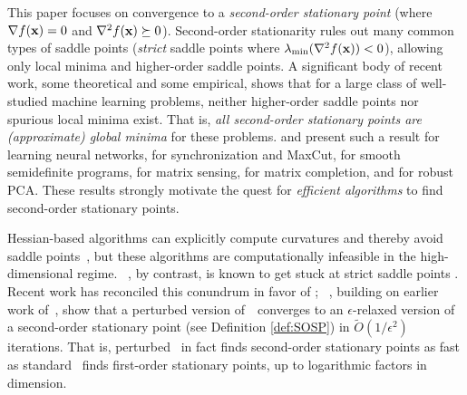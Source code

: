This paper focuses on convergence to a \emph{second-order stationary point} 
(where $\nabla f(\mathbf{x}) = 0$ and $\nabla^2 f(\mathbf{x}) \succeq 0$). Second-order stationarity 
rules out many common types of saddle points (\emph{strict} saddle points where 
$\lambda_{\min}(\nabla^2 f(\mathbf{x})) <0$), allowing only local minima and higher-order saddle 
points. A significant body of recent work, some theoretical and some empirical, shows
that for a large class of well-studied machine learning problems, neither higher-order 
saddle points nor spurious local minima exist. That is, \emph{all second-order stationary 
points are (approximate) global minima} for these problems. \citet{choromanska2014loss}
and \citet{kawaguchi2016deep} 
present such a result for learning neural networks, \citet{bandeira2016low,mei2017solving} 
for synchronization and MaxCut, \citet{boumal2016non} for smooth semidefinite programs, 
\citet{bhojanapalli2016global} for matrix sensing, \citet{ge2016matrix} for matrix completion, and
\citet{ge2017no} for robust PCA.
These results strongly motivate the quest for \emph{efficient algorithms} to find second-order stationary points.

Hessian-based algorithms can explicitly compute curvatures and thereby avoid saddle 
points~\citep[see, e.g.,][]{nesterov2006cubic, curtis2014trust}, but these algorithms 
are computationally
infeasible in the high-dimensional regime.  ~\gd, by contrast, is known to get stuck at 
strict saddle points \cite[Section~1.2.3]{nesterov1998introductory}.  Recent work has
reconciled this conundrum in favor of \gd; ~\cite{jin2017escape}, building on earlier work 
of~\cite{ge2015escaping}, show that a perturbed version of~\gd~converges to an $\epsilon$-relaxed 
version of a second-order stationary point (see Definition \ref{def:SOSP}) in $\tilde{O}(1/\epsilon^2)$ 
iterations.  That is, perturbed \gd~in fact finds second-order stationary points as fast as
standard \gd~finds first-order stationary points, up to logarithmic factors in dimension.

